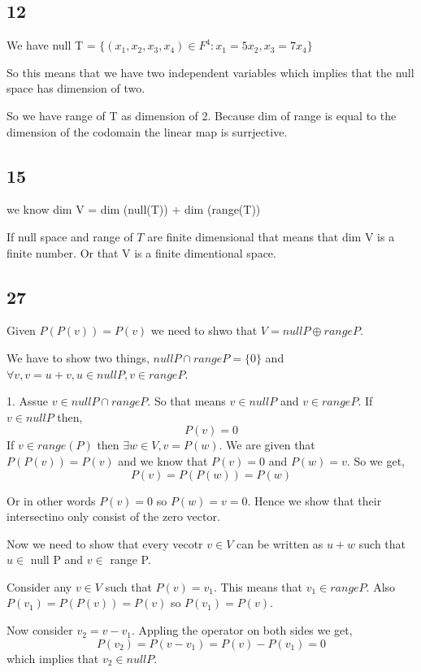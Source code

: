 \documentclass[a4paper]{report}
\begin{document}
\subsection*{12}

We have null T = $\{(x_1,x_2,x_3,x_4) \in F^4 : x_1 = 5x_2, x_3 = 7x_4\}$

So this means that we have two independent variables which implies that the null space has dimension of two. 

So we have range of T as dimension of 2. Because dim of range is equal to the dimension of the codomain the linear map is surrjective.

\subsection*{15}

we know dim V = dim (null(T)) + dim (range(T))

If null space and range of $T$ are finite dimensional that means that dim V is a finite number. Or that V is a finite dimentional space.


\subsection*{27}
Given $P(P(v)) = P(v)$ we need to shwo that $V = null P \oplus range P$.

We have to show two things, $null P \cap range P = \{0\}$ and  $\forall v, v = u + v, u \in null P, v \in range P$.

1. Assue  $v \in null P \cap range P$. So that means $v \in null P $ and  $v \in range P$. If $v \in null P$ then, 
$$ P(v) = 0 $$
If $v \in range(P)$ then $\exists w\in V, v = P(w)$. We are given that $P(P(v)) = P(v)$ and we know that $P(v) = 0$ and $P(w) = v$. So we get,  
$$P(v) = P(P(w)) = P(w)$$

Or in other words $P(v) = 0 $ so  $P(w) = v = 0$. Hence we show that their intersectino only consist of the zero vector.

Now we need to show that every vecotr $v \in V$ can be written as $u + w$ such that $u \in $ null P and $v \in $ range P.

Consider  any $v \in V$ such that $P(v) = v_1$. This means that $v_1 \in range P$. Also $P(v_1) = P(P(v)) = P(v)$ so $P(v_1) = P(v)$.

Now consider $v_2 = v - v_1$. Appling the operator on both sides we get, 
$$ P(v_2) = P(v - v_1) = P(v) - P(v_1) = 0 $$  which implies that $v_2 \in null P$.
\end{document}
